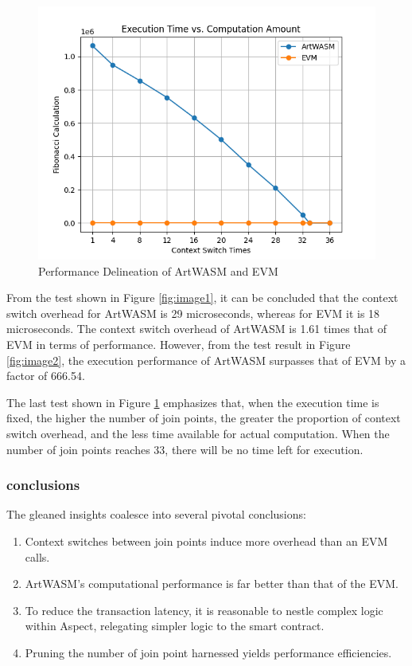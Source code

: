 \begin{figure}[htp]
\begin{minipage}{0.3\textwidth}
    \centering
    \includegraphics[width=1\linewidth]{sections/tx-latency-na-vs-jpc.png}
    \caption{Performance Delineation of ArtWASM and EVM}
    \label{fig:image3}
  \end{minipage}
\end{figure}

From the test shown in Figure \ref{fig:image1}, it can be concluded that the context switch overhead for ArtWASM is 29 microseconds, whereas for EVM it is 18 microseconds. The context switch overhead of ArtWASM is 1.61 times that of EVM in terms of performance. However, from the test result in Figure \ref{fig:image2}, the execution performance of ArtWASM surpasses that of EVM by a factor of 666.54.

The last test shown in Figure \ref{fig:image3} emphasizes that, when the execution time is fixed, the higher the number of join points, the greater the proportion of context switch overhead, and the less time available for actual computation. When the number of join points reaches 33, there will be no time left for execution.

\subsubsection{conclusions}
The gleaned insights coalesce into several pivotal conclusions:

\begin{enumerate}
  \item Context switches between join points induce more overhead than an EVM calls.
  \item ArtWASM's computational performance is far better than that of the EVM.
  \item To reduce the transaction latency, it is reasonable to nestle complex logic within Aspect, relegating simpler logic to the smart contract.
  \item Pruning the number of join point harnessed yields performance efficiencies.
\end{enumerate}

